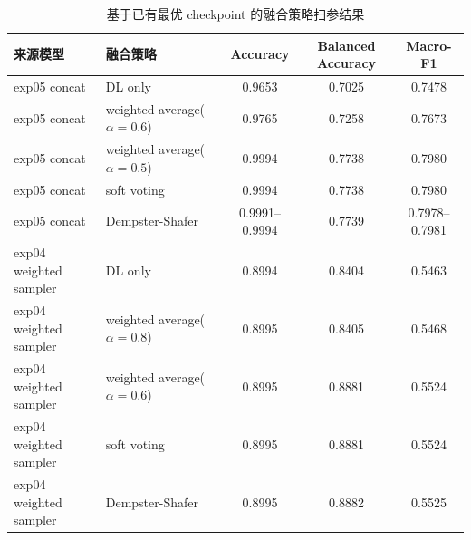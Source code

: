 \begin{table}[H]
\centering
\caption{基于已有最优 checkpoint 的融合策略扫参结果}
\label{tab:fusionstudy}
\begin{tabular}{p{3.3cm}p{3.5cm}ccc}
\toprule
来源模型 & 融合策略 & Accuracy & Balanced Accuracy & Macro-F1 \\
\midrule
exp05 concat & DL only & 0.9653 & 0.7025 & 0.7478 \\
exp05 concat & weighted average($\alpha=0.6$) & 0.9765 & 0.7258 & 0.7673 \\
exp05 concat & weighted average($\alpha=0.5$) & 0.9994 & 0.7738 & 0.7980 \\
exp05 concat & soft voting & 0.9994 & 0.7738 & 0.7980 \\
exp05 concat & Dempster-Shafer & 0.9991--0.9994 & 0.7739 & 0.7978--0.7981 \\
\midrule
exp04 weighted sampler & DL only & 0.8994 & 0.8404 & 0.5463 \\
exp04 weighted sampler & weighted average($\alpha=0.8$) & 0.8995 & 0.8405 & 0.5468 \\
exp04 weighted sampler & weighted average($\alpha=0.6$) & 0.8995 & 0.8881 & 0.5524 \\
exp04 weighted sampler & soft voting & 0.8995 & 0.8881 & 0.5524 \\
exp04 weighted sampler & Dempster-Shafer & 0.8995 & 0.8882 & 0.5525 \\
\bottomrule
\end{tabular}
\end{table}
